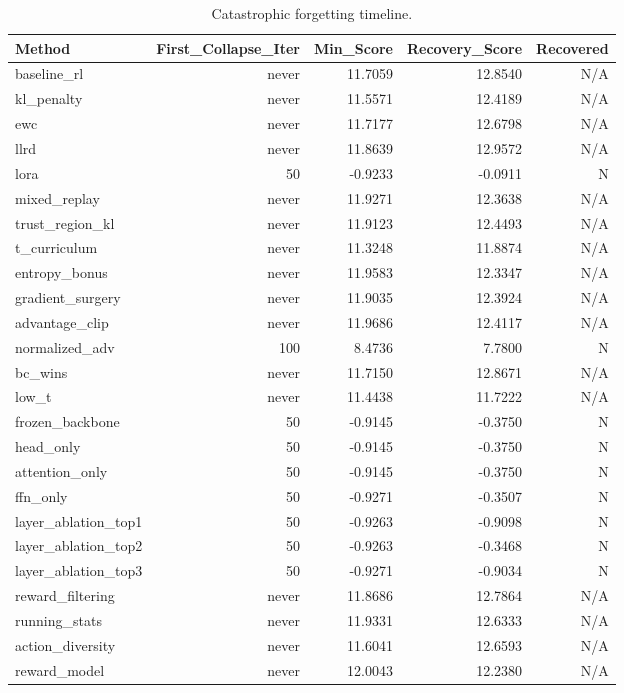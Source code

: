 \begin{table}[htbp]
\centering
\caption{Catastrophic forgetting timeline.}
\label{tab:forgetting}
\begin{tabular}{lrrrr}
\toprule
\textbf{Method} & \textbf{First_Collapse_Iter} & \textbf{Min_Score} & \textbf{Recovery_Score} & \textbf{Recovered} \\
\midrule
baseline_rl & never & 11.7059 & 12.8540 & N/A \\
kl_penalty & never & 11.5571 & 12.4189 & N/A \\
ewc & never & 11.7177 & 12.6798 & N/A \\
llrd & never & 11.8639 & 12.9572 & N/A \\
lora & 50 & -0.9233 & -0.0911 & N \\
mixed_replay & never & 11.9271 & 12.3638 & N/A \\
trust_region_kl & never & 11.9123 & 12.4493 & N/A \\
t_curriculum & never & 11.3248 & 11.8874 & N/A \\
entropy_bonus & never & 11.9583 & 12.3347 & N/A \\
gradient_surgery & never & 11.9035 & 12.3924 & N/A \\
advantage_clip & never & 11.9686 & 12.4117 & N/A \\
normalized_adv & 100 & 8.4736 & 7.7800 & N \\
bc_wins & never & 11.7150 & 12.8671 & N/A \\
low_t & never & 11.4438 & 11.7222 & N/A \\
frozen_backbone & 50 & -0.9145 & -0.3750 & N \\
head_only & 50 & -0.9145 & -0.3750 & N \\
attention_only & 50 & -0.9145 & -0.3750 & N \\
ffn_only & 50 & -0.9271 & -0.3507 & N \\
layer_ablation_top1 & 50 & -0.9263 & -0.9098 & N \\
layer_ablation_top2 & 50 & -0.9263 & -0.3468 & N \\
layer_ablation_top3 & 50 & -0.9271 & -0.9034 & N \\
reward_filtering & never & 11.8686 & 12.7864 & N/A \\
running_stats & never & 11.9331 & 12.6333 & N/A \\
action_diversity & never & 11.6041 & 12.6593 & N/A \\
reward_model & never & 12.0043 & 12.2380 & N/A \\
\bottomrule
\end{tabular}
\end{table}